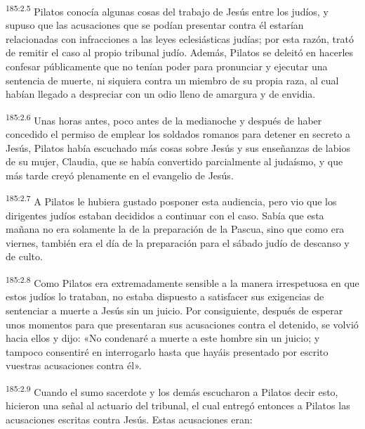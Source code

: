 \par
\textsuperscript{185:2.5} Pilatos conocía algunas cosas del trabajo de Jesús entre los judíos, y supuso que las acusaciones que se podían presentar contra él estarían relacionadas con infracciones a las leyes eclesiásticas judías; por esta razón, trató de remitir el caso al propio tribunal judío. Además, Pilatos se deleitó en hacerles confesar públicamente que no tenían poder para pronunciar y ejecutar una sentencia de muerte, ni siquiera contra un miembro de su propia raza, al cual habían llegado a despreciar con un odio lleno de amargura y de envidia.

\par
\textsuperscript{185:2.6} Unas horas antes, poco antes de la medianoche y después de haber concedido el permiso de emplear los soldados romanos para detener en secreto a Jesús, Pilatos había escuchado más cosas sobre Jesús y sus enseñanzas de labios de su mujer, Claudia, que se había convertido parcialmente al judaísmo, y que más tarde creyó plenamente en el evangelio de Jesús.

\par
\textsuperscript{185:2.7} A Pilatos le hubiera gustado posponer esta audiencia, pero vio que los dirigentes judíos estaban decididos a continuar con el caso. Sabía que esta mañana no era solamente la de la preparación de la Pascua, sino que como era viernes, también era el día de la preparación para el sábado judío de descanso y de culto.

\par
\textsuperscript{185:2.8} Como Pilatos era extremadamente sensible a la manera irrespetuosa en que estos judíos lo trataban, no estaba dispuesto a satisfacer sus exigencias de sentenciar a muerte a Jesús sin un juicio. Por consiguiente, después de esperar unos momentos para que presentaran sus acusaciones contra el detenido, se volvió hacia ellos y dijo: «No condenaré a muerte a este hombre sin un juicio; y tampoco consentiré en interrogarlo hasta que hayáis presentado por escrito vuestras acusaciones contra él».

\par
\textsuperscript{185:2.9} Cuando el sumo sacerdote y los demás escucharon a Pilatos decir esto, hicieron una señal al actuario del tribunal, el cual entregó entonces a Pilatos las acusaciones escritas contra Jesús. Estas acusaciones eran:

